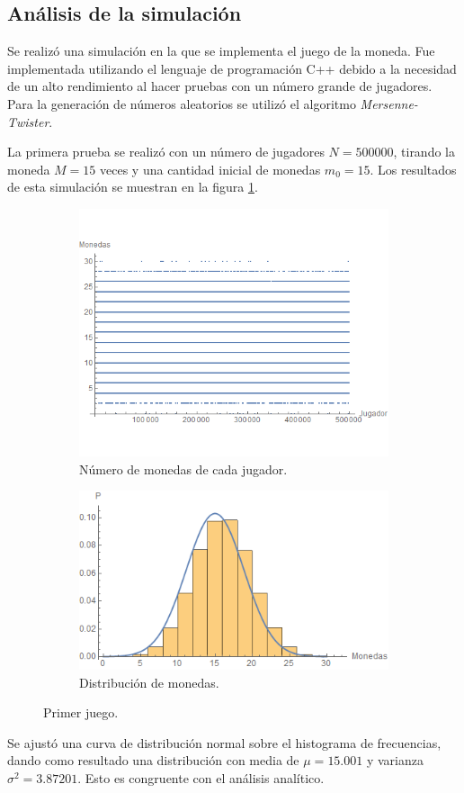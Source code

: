 \documentclass[letterpaper,11pt]{article}
\begin{document}
\subsection*{Análisis de la simulación}
Se realizó una simulación en la que se implementa el juego de la moneda. Fue implementada utilizando el lenguaje de programación C++ debido a la necesidad de un alto rendimiento al hacer pruebas con un número grande de jugadores. Para la generación de números aleatorios se utilizó el algoritmo \textit{Mersenne-Twister}.

La primera prueba se realizó con un número de jugadores $N=500000$, tirando la moneda $M=15$ veces y una cantidad inicial de monedas $m_0 = 15$. Los resultados de esta simulación se muestran en la figura \ref{fig:Juego1}.
\begin{figure}[h!]
\begin{subfigure}{.5\textwidth}
	\centering
	\includegraphics[scale=0.5]{img/Fig6}
	\caption{Número de monedas de cada jugador.}
\end{subfigure}%
\begin{subfigure}{.5\textwidth}
	\centering
	\includegraphics[scale=0.5]{img/Fig1}
	\caption{Distribución de monedas.}
\end{subfigure}%
\caption{Primer juego.}
\label{fig:Juego1}
\end{figure}
Se ajustó una curva de distribución normal sobre el histograma de frecuencias, dando como resultado una distribución con media de $\mu = 15.001$ y varianza $\sigma^2 = 3.87201$. Esto es congruente con el análisis analítico.
\end{document}
